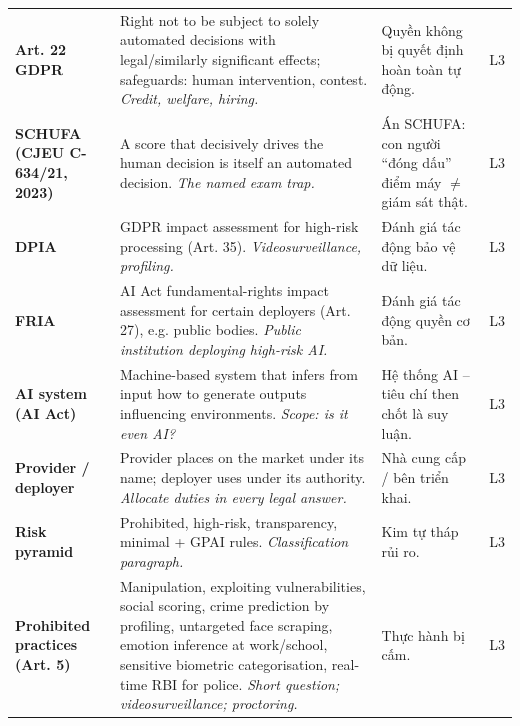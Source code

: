 \documentclass[11pt,a4paper]{article}
\begin{document}
{\begin{longtable}{>{\RaggedRight\arraybackslash\bfseries}p{3.3cm}>{\RaggedRight\arraybackslash}p{5.1cm}>{\RaggedRight\arraybackslash}p{5.1cm}>{\centering\arraybackslash}p{0.8cm}}
Art. 22 GDPR & Right not to be subject to solely automated decisions with legal/similarly significant effects; safeguards: human intervention, contest. \newline\textit{\color{teal}Credit, welfare, hiring.} & \textcolor{tipc}{Quyền không bị quyết định hoàn toàn tự động.} & L3\\[3pt]
SCHUFA (CJEU C-634/21, 2023) & A score that decisively drives the human decision is itself an automated decision. \newline\textit{\color{teal}The named exam trap.} & \textcolor{tipc}{Án SCHUFA: con người “đóng dấu” điểm máy $\neq$ giám sát thật.} & L3\\[3pt]
DPIA & GDPR impact assessment for high-risk processing (Art. 35). \newline\textit{\color{teal}Videosurveillance, profiling.} & \textcolor{tipc}{Đánh giá tác động bảo vệ dữ liệu.} & L3\\[3pt]
FRIA & AI Act fundamental-rights impact assessment for certain deployers (Art. 27), e.g. public bodies. \newline\textit{\color{teal}Public institution deploying high-risk AI.} & \textcolor{tipc}{Đánh giá tác động quyền cơ bản.} & L3\\[3pt]
AI system (AI Act) & Machine-based system that infers from input how to generate outputs influencing environments. \newline\textit{\color{teal}Scope: is it even AI?} & \textcolor{tipc}{Hệ thống AI – tiêu chí then chốt là suy luận.} & L3\\[3pt]
Provider / deployer & Provider places on the market under its name; deployer uses under its authority. \newline\textit{\color{teal}Allocate duties in every legal answer.} & \textcolor{tipc}{Nhà cung cấp / bên triển khai.} & L3\\[3pt]
Risk pyramid & Prohibited, high-risk, transparency, minimal + GPAI rules. \newline\textit{\color{teal}Classification paragraph.} & \textcolor{tipc}{Kim tự tháp rủi ro.} & L3\\[3pt]
Prohibited practices (Art. 5) & Manipulation, exploiting vulnerabilities, social scoring, crime prediction by profiling, untargeted face scraping, emotion inference at work/school, sensitive biometric categorisation, real-time RBI for police. \newline\textit{\color{teal}Short question; videosurveillance; proctoring.} & \textcolor{tipc}{Thực hành bị cấm.} & L3\\[3pt]

\end{longtable}}
\end{document}
